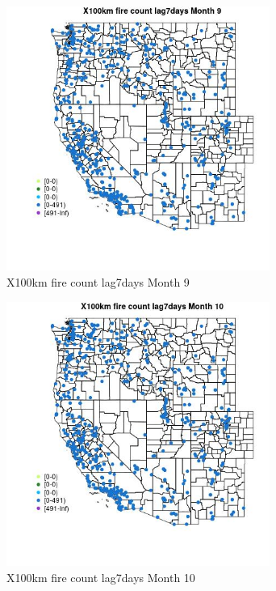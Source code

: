 \begin{figure} 
\centering  
\includegraphics[width=0.77\textwidth]{Code_Outputs/Report_ML_input_PM25_Step4_part_e_de_duplicated_aves_compiled_2019-05-14wNAs_MapObsMo9X100km_fire_count_lag7days.jpg} 
\caption{\label{fig:Report_ML_input_PM25_Step4_part_e_de_duplicated_aves_compiled_2019-05-14wNAsMapObsMo9X100km_fire_count_lag7days}X100km fire count lag7days Month 9} 
\end{figure} 
 

\begin{figure} 
\centering  
\includegraphics[width=0.77\textwidth]{Code_Outputs/Report_ML_input_PM25_Step4_part_e_de_duplicated_aves_compiled_2019-05-14wNAs_MapObsMo10X100km_fire_count_lag7days.jpg} 
\caption{\label{fig:Report_ML_input_PM25_Step4_part_e_de_duplicated_aves_compiled_2019-05-14wNAsMapObsMo10X100km_fire_count_lag7days}X100km fire count lag7days Month 10} 
\end{figure} 
 

